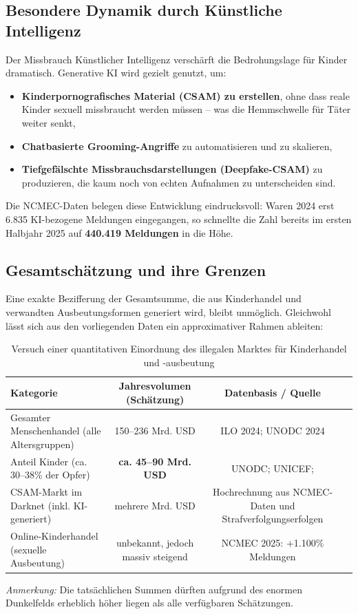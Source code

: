 \documentclass[11pt,a4paper]{article}
\begin{document}
	\subsection{Besondere Dynamik durch Künstliche Intelligenz}
	
	Der Missbrauch Künstlicher Intelligenz verschärft die Bedrohungslage für Kinder dramatisch. Generative KI wird gezielt genutzt, um:
	\begin{itemize}
		\item \textbf{Kinderpornografisches Material (CSAM) zu erstellen}, ohne dass reale Kinder sexuell missbraucht werden müssen – was die Hemmschwelle für Täter weiter senkt,
		\item \textbf{Chatbasierte Grooming-Angriffe} zu automatisieren und zu skalieren,
		\item \textbf{Tiefgefälschte Missbrauchsdarstellungen (Deepfake-CSAM)} zu produzieren, die kaum noch von echten Aufnahmen zu unterscheiden sind.
	\end{itemize}
	Die NCMEC-Daten belegen diese Entwicklung eindrucksvoll: Waren 2024 erst 6.835 KI-bezogene Meldungen eingegangen, so schnellte die Zahl bereits im ersten Halbjahr 2025 auf \textbf{440.419 Meldungen} in die Höhe.
	
	\subsection{Gesamtschätzung und ihre Grenzen}
	
	Eine exakte Bezifferung der Gesamtsumme, die aus Kinderhandel und verwandten Ausbeutungsformen generiert wird, bleibt unmöglich. Gleichwohl lässt sich aus den vorliegenden Daten ein approximativer Rahmen ableiten:
	
	\begin{table}[ht]
		\centering
		\caption{Versuch einer quantitativen Einordnung des illegalen Marktes für Kinderhandel und -ausbeutung}
		\begin{tabular}{@{}lccc@{}}
			\toprule
			\textbf{Kategorie} & \textbf{Jahresvolumen (Schätzung)} & \textbf{Datenbasis / Quelle} \\
			\midrule
			Gesamter Menschenhandel (alle Altersgruppen) & 150–236 Mrd. USD & ILO 2024; UNODC 2024 \\
			Anteil Kinder (ca. 30–38\% der Opfer) & \textbf{ca. 45–90 Mrd. USD} & UNODC; UNICEF; \\
			CSAM-Markt im Darknet (inkl. KI-generiert) & mehrere Mrd. USD & Hochrechnung aus NCMEC-Daten und Strafverfolgungserfolgen \\
			Online-Kinderhandel (sexuelle Ausbeutung) & unbekannt, jedoch massiv steigend & NCMEC 2025: +1.100\% Meldungen \\
			\bottomrule
		\end{tabular}
	\end{table}
	\vspace{0.5em}
	\textit{Anmerkung:} Die tatsächlichen Summen dürften aufgrund des enormen Dunkelfelds erheblich höher liegen als alle verfügbaren Schätzungen.
	
\end{document}

